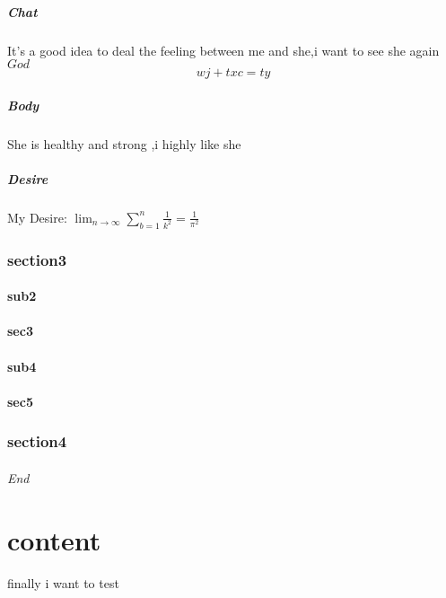\documentclass[11pt,a4paper,twoside]{article}
\begin{document}
\subsubsection{Chat}
It's a good idea to deal the feeling between me and she,i want to see she again $God$
\begin{equation}
\label{Child}
  wj+txc=ty  
\end{equation}
\subsubsection{Body}
She is healthy and strong ,i highly like she 
\subsubsection{Desire}
My Desire:
$
\lim_{n \to \infty}
\sum_{b=1}^{n} \frac{1}{k^2}
=\frac{1}{\pi^2}
$
\section{section3}
\subsection{sub2}
\subsection{sec3}
\subsection{sub4}
\subsection{sec5}
\section{section4}
\paragraph{End}
\part{content}
finally\newpage
i want to test
\end{document}
